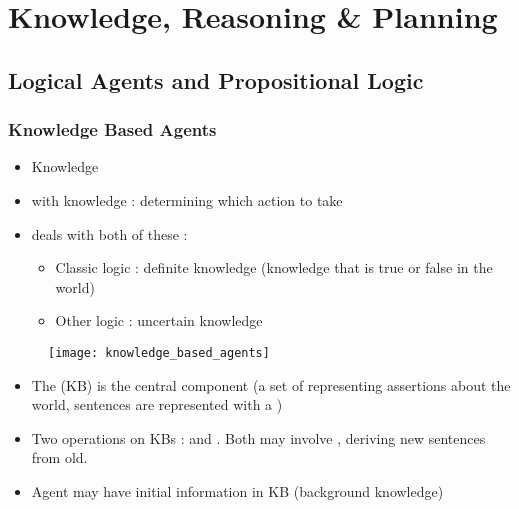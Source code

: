 \chapter{Knowledge, Reasoning \& Planning}

\section{Logical Agents and Propositional Logic}

\subsection{Knowledge Based Agents}

\begin{minipage}{0.58\textwidth}
	\begin{itemize}
	\item Knowledge 
	\item {} with knowledge : determining which action to take
	\item {} deals with both of these :
		\begin{itemize}
		\item Classic logic : definite knowledge (knowledge that is true or false in the world)
		\item Other logic : uncertain knowledge
		\end{itemize}
	\end{itemize}
\end{minipage}
\begin{minipage}{0.4\textwidth}
	\begin{figure}[H]
		\centering
		\texttt{[image: knowledge\_based\_agents]}
	\end{figure}
\end{minipage}

\begin{itemize}
\item The  (KB) is the central component (a set of  representing assertions about the world, sentences are represented with  a )
\item Two operations on KBs :  and . Both may involve , deriving new sentences from old.
\item Agent may have initial information in KB (background knowledge)
\end{itemize}

